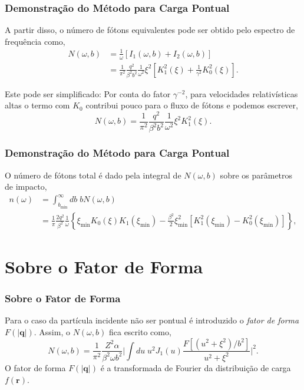 \documentclass[xcolor=dvipsnames]{beamer}
\renewcommand{\vec}{\mathbf}
\begin{document}
\begin{frame}
	\frametitle{Demonstração do Método para Carga Pontual}
	A partir disso, o número de fótons equivalentes pode ser obtido pelo
	espectro de frequência como,
	\begin{equation}
		\begin{split}
		N(\omega , b) &= \frac{1}{\omega} \left[ I_1 (\omega , b) + I_2(\omega
			, b) \right]\\
			&= \frac{1}{\pi ^2} \frac{q^2} {\beta ^2 b^2}
			\frac{1}{\omega ^2} \xi ^2 \left[K_1^2 (\xi ) + \frac{1}{\gamma ^2}
			K_0 ^2 (\xi ) \right]. \label{eq_EP-SPEC}
		\end{split}
	\end{equation}
	\begin{block}{Este pode ser simplificado:}
		Por conta do fator $\gamma ^{-2}$, para velocidades relativísticas altas o
		termo com $K_0$ contribui pouco para o fluxo de fótons e podemos escrever,
		\begin{equation}
			N(\omega , b) = \frac{1}{\pi ^2} \frac{q^2} {\beta ^2 b^2}
			\frac{1}{\omega ^2} \xi ^2 K_1 ^2 (\xi).
		\end{equation}
	\end{block}
\end{frame}

\begin{frame}
	\frametitle{Demonstração do Método para Carga Pontual}
	O número de fótons total é dado pela integral de $N(\omega , b)$ sobre os
	parâmetros de impacto,
	\begin{equation}
	\begin{split}
		n(\omega) &= \int _{b_{\text{min}}}^\infty db\; bN(\omega , b) \\ 
		&= \frac{1}{\pi} \frac{2q^2}{\beta ^2} \frac{1}{\omega} \left\{ \xi
		_\text{min} K_0 \left( \xi \right) K_1 \left( \xi _\text{min} \right) -
		\frac{\beta ^2}{2} \xi _\text{min} ^2 \left[ K_1 ^2 \left( \xi
		_\text{min} \right) - K_0 ^2 \left( \xi _\text{min} \right) \right]
		\right\}, \label{eq_EPT}
	\end{split}
	\end{equation}
\end{frame}

\section{Sobre o Fator de Forma}
\begin{frame}
	\frametitle{Sobre o Fator de Forma}
	Para o caso da partícula incidente não ser pontual é introduzido o
	\textit{fator de forma} $F(|\vec{q}|)$. Assim, o $N(\omega , b)$ fica
	escrito como,
	\begin{equation}
		N(\omega , b) = \frac{1}{\pi ^2} \frac{Z^2 \alpha}{\beta ^2 \omega b^2}
		\Bigg| \int du \; u^2 J_1 (u) \frac{F[(u^2 + \xi ^2)/b^2]}{u^2 + \xi ^2}
		\Bigg|^2. \label{eq_EP-SPEC-F}
	\end{equation}
	O fator de forma $F(|\vec{q}|)$ é a transformada de Fourier da distribuição
	de carga $f(\vec{r})$.
\end{frame}
\end{document}
